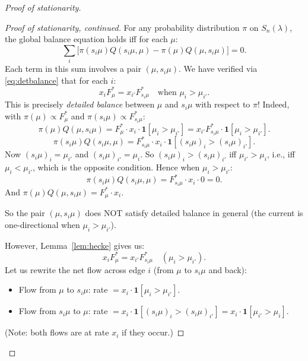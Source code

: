 \documentclass[12pt]{article}
\theoremstyle{definition}
\begin{document}
\begin{proof}[Proof of stationarity]
\begin{proof}[Proof of stationarity, continued]
For any probability distribution $\pi$ on $S_n(\lambda)$, the global balance
equation holds iff for each $\mu$:
\[
  \sum_{i} \bigl[ \pi(s_i\mu) Q(s_i\mu, \mu) - \pi(\mu) Q(\mu, s_i\mu) \bigr] = 0.
\]
Each term in this sum involves a pair $(\mu, s_i\mu)$.  We have verified via
\eqref{eq:detbalance} that for each $i$:
\[
  x_i F^*_\mu = x_{i'} F^*_{s_i\mu} \quad \text{when } \mu_i > \mu_{i'}.
\]
This is precisely \emph{detailed balance} between $\mu$ and $s_i\mu$ with
respect to $\pi$!  Indeed, with $\pi(\mu) \propto F^*_\mu$ and $\pi(s_i\mu)
\propto F^*_{s_i\mu}$:
\[
  \pi(\mu) Q(\mu, s_i\mu) = F^*_\mu \cdot x_i \cdot \mathbf{1}[\mu_i > \mu_{i'}]
  = x_{i'} F^*_{s_i\mu} \cdot \mathbf{1}[\mu_i > \mu_{i'}].
\]
\[
  \pi(s_i\mu) Q(s_i\mu, \mu) = F^*_{s_i\mu} \cdot x_i \cdot \mathbf{1}[(s_i\mu)_i > (s_i\mu)_{i'}].
\]
Now $(s_i\mu)_i = \mu_{i'}$ and $(s_i\mu)_{i'} = \mu_i$.  So
$(s_i\mu)_i > (s_i\mu)_{i'}$ iff $\mu_{i'} > \mu_i$, i.e., iff $\mu_i <
\mu_{i'}$, which is the opposite condition.  Hence when $\mu_i > \mu_{i'}$:
\[
  \pi(s_i\mu) Q(s_i\mu, \mu) = F^*_{s_i\mu} \cdot x_i \cdot 0 = 0.
\]
And $\pi(\mu) Q(\mu, s_i\mu) = F^*_\mu \cdot x_i$.

So the pair $(\mu, s_i\mu)$ does NOT satisfy detailed balance in general (the
current is one-directional when $\mu_i > \mu_{i'}$).

However, Lemma~\ref{lem:hecke} gives us:
\[
  x_i F^*_\mu = x_{i'} F^*_{s_i\mu} \quad (\mu_i > \mu_{i'}).
\]
Let us rewrite the net flow across edge $i$ (from $\mu$ to $s_i\mu$ and back):
\begin{itemize}
\item Flow from $\mu$ to $s_i\mu$: rate $= x_i \cdot \mathbf{1}[\mu_i > \mu_{i'}]$.
\item Flow from $s_i\mu$ to $\mu$: rate $= x_i \cdot \mathbf{1}[(s_i\mu)_i > (s_i\mu)_{i'}]
  = x_i \cdot \mathbf{1}[\mu_{i'} > \mu_i]$.
\end{itemize}

(Note: both flows are at rate $x_i$ if they occur.)


\end{proof}
\end{proof}
\end{document}
